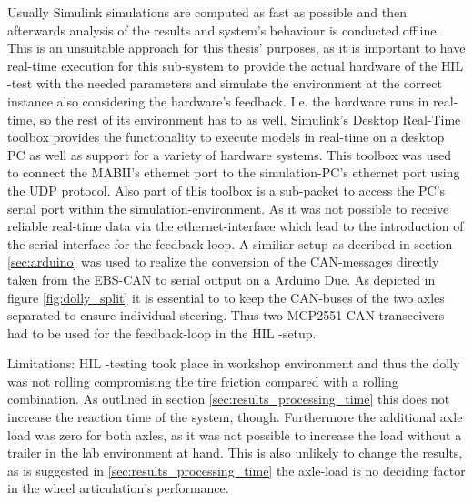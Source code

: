 \documentclass[ExampleMasters.tex]{subfiles}
\begin{document}
Usually Simulink simulations are computed as fast as possible and then afterwards analysis of the results and system's behaviour is conducted offline. This is an unsuitable approach for this thesis' purposes, as it is important to have real-time execution for this sub-system to provide the actual hardware of the \gls{HIL} -test with the needed parameters and simulate the environment at the correct instance also considering the hardware's feedback. I.e. the hardware runs in real-time, so the rest of its environment has to as well. Simulink's Desktop Real-Time toolbox provides the functionality to execute models in real-time on a desktop PC as well as support for a variety of hardware systems. This toolbox was used to connect the MABII's ethernet port to the simulation-PC's ethernet port using the \gls{UDP} protocol. Also part of this toolbox is a sub-packet to access the PC's serial port within the simulation-environment. As it was not possible to receive reliable real-time data via the ethernet-interface which lead to the introduction of the serial interface for the feedback-loop. A similiar setup as decribed in section \ref{sec:arduino} was used to realize the conversion of the CAN-messages directly taken from the \gls{EBS}-\gls{CAN} to serial output on a Arduino Due. As depicted in figure \ref{fig:dolly_split} it is essential to to keep the CAN-buses of the two axles separated to ensure individual steering. Thus two MCP2551 \gls{CAN}-transceivers had to be used for the feedback-loop in the \gls{HIL} -setup.

Limitations: \gls{HIL} -testing took place in workshop environment and thus the dolly was not rolling compromising the tire friction compared with a rolling combination. As outlined in section \ref{sec:results_processing_time} this does not increase the reaction time of the system, though. Furthermore the additional axle load was zero for both axles, as it was not possible to increase the load without a trailer in the lab environment at hand. This is also unlikely to change the results, as is suggested in \ref{sec:results_processing_time} the axle-load is no deciding factor in the wheel articulation's performance. 

%	
\end{document}
